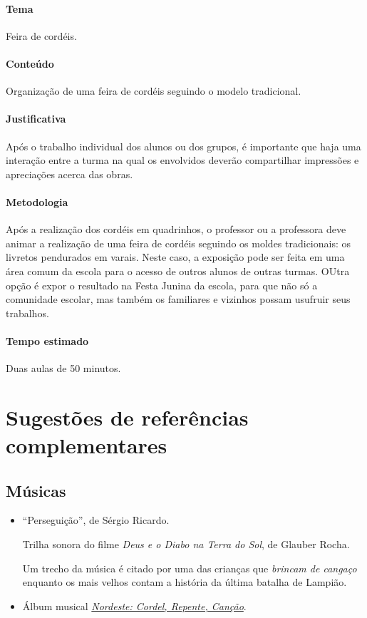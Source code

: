 \documentclass[11pt]{extarticle}
\begin{document}

\paragraph{Tema} Feira de cordéis.

\paragraph{Conteúdo} Organização de uma feira de cordéis seguindo o modelo tradicional.

\paragraph{Justificativa} Após o trabalho individual dos alunos ou dos grupos,
é importante que haja uma interação entre a turma na qual os envolvidos
deverão compartilhar impressões e apreciações acerca das obras.

\paragraph{Metodologia} Após a realização dos cordéis em quadrinhos,
 o professor ou a professora deve animar a realização de uma feira de cordéis 
  seguindo os moldes tradicionais: os livretos pendurados em varais.
 Neste caso, a exposição pode ser feita em uma área comum da escola para o acesso de outros alunos
 de outras turmas. OUtra opção é expor o resultado na Festa Junina da escola, para que não só a comunidade
 escolar, mas também os familiares e vizinhos possam usufruir seus trabalhos.


\paragraph{Tempo estimado} Duas aulas de 50 minutos.
 


\section{Sugestões de referências complementares}

\subsection{Músicas} 

\begin{itemize}
	\item ``Perseguição'', de Sérgio Ricardo. 

Trilha sonora do filme \textit{Deus e o Diabo na Terra do Sol}, de Glauber Rocha. 

Um trecho da música é citado por uma das crianças que \textit{brincam de cangaço} enquanto os mais velhos contam a história
da última batalha de Lampião.

	\item Álbum musical \href{https://www.youtube.com/watch?v=wS6jzcZcc6U}{\textit{Nordeste: Cordel, Repente, Canção}}. 
\end{itemize}
\end{document}
